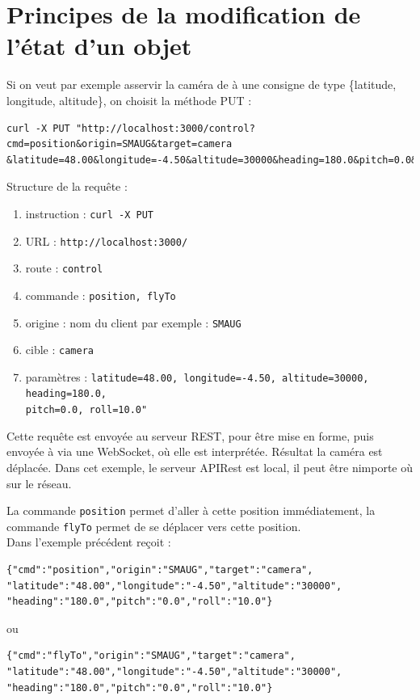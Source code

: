 \section{Principes de la modification de l'état d'un objet}

Si on veut par exemple asservir la caméra de \nav à une consigne de type \{latitude, longitude, altitude\},
on choisit la méthode PUT :
{\small
\begin{verbatim}
curl -X PUT "http://localhost:3000/control?cmd=position&origin=SMAUG&target=camera
&latitude=48.00&longitude=-4.50&altitude=30000&heading=180.0&pitch=0.0&roll=10.0"
\end{verbatim}
}

Structure de la requête :
\begin{enumerate}
\item instruction :  {\tt curl -X PUT }
\item URL : {\tt http://localhost:3000/}
\item route : {\tt control}
\item commande : {\tt position, flyTo}
\item origine : nom du client par exemple : {\tt SMAUG}
\item cible : {\tt camera}
\item paramètres : {\tt latitude=48.00, longitude=-4.50, altitude=30000, heading=180.0, \\
pitch=0.0, roll=10.0"}
\end{enumerate}

Cette requête est envoyée au serveur REST, pour être mise en forme, puis envoyée à \nav via une WebSocket, où elle est interprétée. Résultat la caméra est déplacée. Dans cet exemple, le serveur APIRest est local, il peut être nimporte où sur le réseau.

La commande {\tt position} permet d'aller à cette position immédiatement, la commande {\tt flyTo} permet de se déplacer vers cette position.\\

Dans l'exemple précédent \nav reçoit :

\begin{verbatim}{"cmd":"position","origin":"SMAUG","target":"camera",
"latitude":"48.00","longitude":"-4.50","altitude":"30000",
"heading":"180.0","pitch":"0.0","roll":"10.0"}
\end{verbatim}
ou
\begin{verbatim}{"cmd":"flyTo","origin":"SMAUG","target":"camera",
"latitude":"48.00","longitude":"-4.50","altitude":"30000",
"heading":"180.0","pitch":"0.0","roll":"10.0"}
\end{verbatim}

